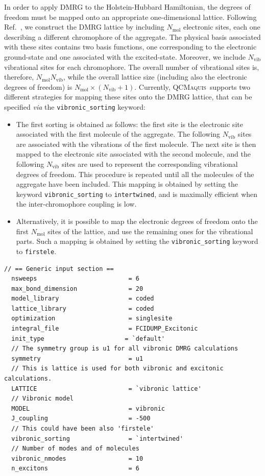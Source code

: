 \documentclass[bibliography=totoc,12pt,a4paper]{scrartcl}
\newcommand{\qcm}{\textsc{QCMaquis}}
\begin{document}
In order to apply DMRG to the Holstein-Hubbard Hamiltonian, the degrees of freedom must be mapped onto an appropriate one-dimensional lattice.
Following Ref.~, we construct the DMRG lattice by including $N_\text{mol}$ electronic sites, each one describing a different chromophore of the aggregate.
The physical basis associated with these sites contains two basis functions, one corresponding to the electronic ground-state and one associated with the excited-state.
Moreover, we include $N_\text{vib}$ vibrational sites for each chromophore.
The overall number of vibrational sites is, therefore, $N_\text{mol} N_\text{vib}$, while the overall lattice size (including also the electronic degrees of freedom) is $N_\text{mol} \times (N_\text{vib}+1)$.
Currently, \qcm\ supports two different strategies for mapping these sites onto the DMRG lattice, that can be specified \textit{via} the \texttt{vibronic\_sorting} keyword:

\begin{itemize}
  \item The first sorting is obtained as follows: the first site is the electronic site associated with the first molecule of the aggregate. The following $N_\text{vib}$ sites are associated with the vibrations of the first molecule. The next site is then mapped to the electronic site associated with the second molecule, and the following $N_\text{vib}$ sites are used to represent the corresponding vibrational degrees of freedom. This procedure is repeated until all the molecules of the aggregate have been included. This mapping is obtained by setting the keyword \texttt{vibronic\_sorting} to \texttt{intertwined}, and is maximally efficient when the inter-chromophore coupling is low.
  \item Alternatively, it is possible to map the electronic degrees of freedom onto the first $N_\text{mol}$ sites of the lattice, and use the remaining ones for the vibrational parts.
  Such a mapping is obtained by setting the \texttt{vibronic\_sorting} keyword to \texttt{firstele}.
\end{itemize}

\begin{lstlisting}[language=qcmaquis,
				   caption={Input example for an excitonic DMRG calculation},
				   label=lst:excitonicInput]
  // == Generic input section ==
  nsweeps                         = 6
  max_bond_dimension              = 20
  model_library                   = coded
  lattice_library                 = coded
  optimization                    = singlesite
  integral_file                   = FCIDUMP_Excitonic
  init_type                      = `default'
  // The symmetry group is u1 for all vibronic DMRG calculations
  symmetry                        = u1
  // This is lattice is used for both vibronic and excitonic calculations.
  LATTICE                         = `vibronic lattice'
  // Vibronic model
  MODEL                           = vibronic
  J_coupling                      = -500
  // This could have been also 'firstele'
  vibronic_sorting                = `intertwined'
  // Number of modes and of molecules
  vibronic_nmodes                 = 10
  n_excitons                      = 6
\end{lstlisting}
\end{document}
